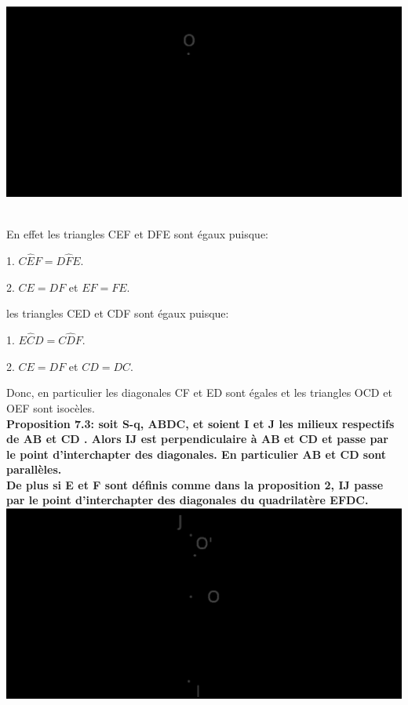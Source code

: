\documentclass[a4paper, 12pt, twoside]{book}
\begin{document}
\includegraphics[scale=0.5]{figures/sacc6.eps}\

En effet les triangles CEF et DFE sont égaux puisque:\

1. $C\hat{E}F=D\hat{F}E$.\

2. $CE=DF$ et $EF=FE$.\

les triangles CED et CDF sont égaux puisque:\

1. $E\hat{C}D=C\hat{D}F$.\

2. $CE=DF$ et $CD=DC$.\

Donc, en particulier les diagonales CF et ED sont égales et les triangles OCD et OEF sont isocèles.\\





 \textbf{Proposition 7.3: soit S-q, ABDC, et soient I et J les milieux respectifs de AB et CD . Alors IJ est perpendiculaire à AB et CD et passe par le point d'interchapter des diagonales. En particulier AB et CD sont parallèles. }\\

\textbf{De plus si E et F sont définis comme dans la proposition 2, IJ passe par le point d'interchapter des diagonales du quadrilatère EFDC. }\\

\includegraphics[scale=0.5]{figures/sacc7.eps} \\
\end{document}
